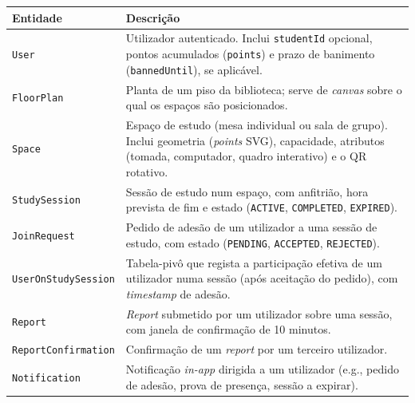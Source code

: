 \documentclass[11pt,a4paper]{article}
\begin{document}
\begin{table}[H]
    \centering
    \renewcommand{\arraystretch}{1.3}
    \begin{tabularx}{\linewidth}{@{}lX@{}}
        \toprule
        \textbf{Entidade}           & \textbf{Descrição}                                                                                                                                                        \\
        \midrule
        \texttt{User}               & Utilizador autenticado. Inclui \texttt{studentId} opcional, pontos acumulados (\texttt{points}) e prazo de banimento (\texttt{bannedUntil}), se aplicável.                \\
        \texttt{FloorPlan}          & Planta de um piso da biblioteca; serve de \emph{canvas} sobre o qual os espaços são posicionados.                                                                         \\
        \texttt{Space}              & Espaço de estudo (mesa individual ou sala de grupo). Inclui geometria (\emph{points} SVG), capacidade, atributos (tomada, computador, quadro interativo) e o QR rotativo. \\
        \texttt{StudySession}       & Sessão de estudo num espaço, com anfitrião, hora prevista de fim e estado (\texttt{ACTIVE}, \texttt{COMPLETED}, \texttt{EXPIRED}).                                        \\
        \texttt{JoinRequest}        & Pedido de adesão de um utilizador a uma sessão de estudo, com estado (\texttt{PENDING}, \texttt{ACCEPTED}, \texttt{REJECTED}).                                            \\
        \texttt{UserOnStudySession} & Tabela-pivô que regista a participação efetiva de um utilizador numa sessão (após aceitação do pedido), com \emph{timestamp} de adesão.                                   \\
        \texttt{Report}             & \emph{Report} submetido por um utilizador sobre uma sessão, com janela de confirmação de 10 minutos.                                                                      \\
        \texttt{ReportConfirmation} & Confirmação de um \emph{report} por um terceiro utilizador.                                                                                                               \\
        \texttt{Notification}       & Notificação \emph{in-app} dirigida a um utilizador (e.g., pedido de adesão, prova de presença, sessão a expirar).                                                         \\

\end{tabularx}
\end{table}
\end{document}
